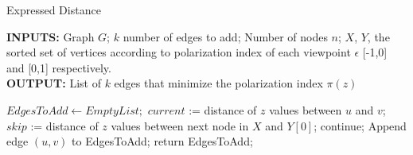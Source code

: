 \begin{algorithm}[htbp]
	\caption{Expressed Distance}
	\label{alg:ExpressedAlgo}
	\begin{flushleft}
        		\textbf{INPUTS:} Graph $G$; $k$ number of edges to add; Number of nodes $n$;
		$X$, $Y $, the sorted set of vertices according to polarization index of each viewpoint $\epsilon$ [-1,0] and [0,1] respectively.\\
		\vspace{6pt}
        		\textbf{OUTPUT:} List of $k$ edges that minimize the polarization index $\pi(z)$
	\end{flushleft}
	\begin{algorithmic}[1]
		\STATE $EdgesToAdd \leftarrow Empty List;$
			\STATE $current$ := distance of $z$ values between $u$ and $v$;
			\STATE $skip$ := distance of $z$ values between next node in $X$ and $Y[0]$;
				\STATE continue;
			\ENDIF
		\STATE Append edge $(u,v)$ to EdgesToAdd;
			\STATE return EdgesToAdd;
		\ENDIF
		\ENDFOR
		\ENDFOR
	\end{algorithmic}
\end{algorithm}

